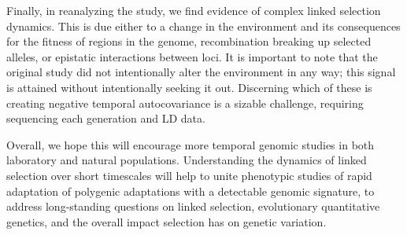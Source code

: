 \documentclass[11pt]{article}
\newcommand{\gc}[1]{{\it \color{red} #1 } }
\begin{document}
Finally, in reanalyzing the \textcite{Barghi2019-qy} study, we find evidence
of complex linked selection dynamics. This is due either to a change in the
environment and its consequences for the fitness of regions in the genome,
recombination breaking up selected alleles, or epistatic interactions between
loci. It is important to note that the original study did not intentionally
alter the environment in any way; this signal is attained without intentionally
seeking it out. Discerning which of these is creating negative temporal
autocovariance is a sizable challenge, requiring sequencing each generation and
LD data.

Overall, we hope this will encourage more temporal genomic studies in both
laboratory and natural populations. Understanding the dynamics of linked
selection over short timescales will help to unite phenotypic studies of rapid
adaptation of polygenic adaptations with a detectable genomic signature, to
address long-standing questions on linked selection, evolutionary quantitative
genetics, and the overall impact selection has on genetic variation. 









\end{document}
